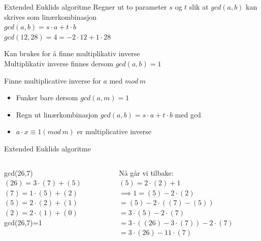 \begin{frame}[fragile]{}
\begin{block}{Extended Euklids algoritme}
Regner ut to parameter $s$ og $t$ slik at $gcd(a,b)$ kan skrives som linærkombinasjon\\
$gcd(a,b)=s\cdot a+t\cdot b$\\
$gcd(12,28)=4=-2\cdot 12 + 1\cdot 28$\medskip

Kan brukes for å finne multiplikativ inverse\\
Multiplikativ inverse finnes dersom $gcd(a,b)=1$
\end{block}
\pause

\begin{block}{Finne multiplicative inverse for $a$ med $mod\, m$}
\begin{itemize}
\item Funker bare dersom $gcd(a,m)=1$\\
\item Regn ut linærkombinasjon $gcd(a,b)=s\cdot a+t\cdot b$ med gcd
\item $a\cdot x \equiv 1 (mod\, m)$ er multiplicative inverse
\end{itemize}
\end{block}
\end{frame}

\begin{frame}{Extended Euklids algoritme}
    \begin{columns}
        \begin{column}{0.45\textwidth}
             gcd(26,7)\\
             
             $(26)=3\cdot (7)+(5)$\\
             $(7)=1\cdot (5)+(2)$\\
             $(5)=2\cdot(2)+(1)$\\
             $(2)=2\cdot(1)+(0)$\\
             
             gcd(26,7)=1
        \end{column}
        \pause
        \begin{column}{0.45\textwidth}
            Nå går vi tilbake:\\
            $(5)=2\cdot(2)+1$\\
            
            $\implies 1=(5)-2\cdot (2)$\\
            $=(5)-2\cdot ((7)-(5))$\\
            $=3\cdot (5)-2\cdot(7)$\\
            $=3\cdot ((26)-3\cdot (7))-2\cdot (7)$\\
            $=3\cdot (26)-11\cdot (7)$
        \end{column}
    \end{columns}
\end{frame}


